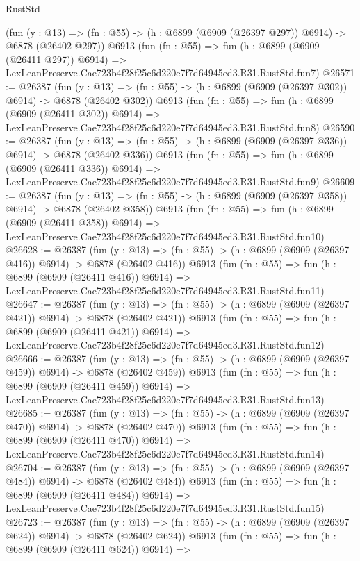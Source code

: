 \begin{lexlean}{RustStd}
\begin{coremodule}
    (fun (y : @13) => (fn : @55) -> (h : @6899 (@6909 (@26397 @297)) @6914) -> @6878 (@26402 @297))
    @6913
    (fun (fn : @55) =>
    fun (h : @6899 (@6909 (@26411 @297)) @6914) =>
    LexLeanPreserve.Cae723b4f28f25c6d220e7f7d64945ed3.R31.RustStd.fun7)
@26571 := @26387
    (fun (y : @13) => (fn : @55) -> (h : @6899 (@6909 (@26397 @302)) @6914) -> @6878 (@26402 @302))
    @6913
    (fun (fn : @55) =>
    fun (h : @6899 (@6909 (@26411 @302)) @6914) =>
    LexLeanPreserve.Cae723b4f28f25c6d220e7f7d64945ed3.R31.RustStd.fun8)
@26590 := @26387
    (fun (y : @13) => (fn : @55) -> (h : @6899 (@6909 (@26397 @336)) @6914) -> @6878 (@26402 @336))
    @6913
    (fun (fn : @55) =>
    fun (h : @6899 (@6909 (@26411 @336)) @6914) =>
    LexLeanPreserve.Cae723b4f28f25c6d220e7f7d64945ed3.R31.RustStd.fun9)
@26609 := @26387
    (fun (y : @13) => (fn : @55) -> (h : @6899 (@6909 (@26397 @358)) @6914) -> @6878 (@26402 @358))
    @6913
    (fun (fn : @55) =>
    fun (h : @6899 (@6909 (@26411 @358)) @6914) =>
    LexLeanPreserve.Cae723b4f28f25c6d220e7f7d64945ed3.R31.RustStd.fun10)
@26628 := @26387
    (fun (y : @13) => (fn : @55) -> (h : @6899 (@6909 (@26397 @416)) @6914) -> @6878 (@26402 @416))
    @6913
    (fun (fn : @55) =>
    fun (h : @6899 (@6909 (@26411 @416)) @6914) =>
    LexLeanPreserve.Cae723b4f28f25c6d220e7f7d64945ed3.R31.RustStd.fun11)
@26647 := @26387
    (fun (y : @13) => (fn : @55) -> (h : @6899 (@6909 (@26397 @421)) @6914) -> @6878 (@26402 @421))
    @6913
    (fun (fn : @55) =>
    fun (h : @6899 (@6909 (@26411 @421)) @6914) =>
    LexLeanPreserve.Cae723b4f28f25c6d220e7f7d64945ed3.R31.RustStd.fun12)
@26666 := @26387
    (fun (y : @13) => (fn : @55) -> (h : @6899 (@6909 (@26397 @459)) @6914) -> @6878 (@26402 @459))
    @6913
    (fun (fn : @55) =>
    fun (h : @6899 (@6909 (@26411 @459)) @6914) =>
    LexLeanPreserve.Cae723b4f28f25c6d220e7f7d64945ed3.R31.RustStd.fun13)
@26685 := @26387
    (fun (y : @13) => (fn : @55) -> (h : @6899 (@6909 (@26397 @470)) @6914) -> @6878 (@26402 @470))
    @6913
    (fun (fn : @55) =>
    fun (h : @6899 (@6909 (@26411 @470)) @6914) =>
    LexLeanPreserve.Cae723b4f28f25c6d220e7f7d64945ed3.R31.RustStd.fun14)
@26704 := @26387
    (fun (y : @13) => (fn : @55) -> (h : @6899 (@6909 (@26397 @484)) @6914) -> @6878 (@26402 @484))
    @6913
    (fun (fn : @55) =>
    fun (h : @6899 (@6909 (@26411 @484)) @6914) =>
    LexLeanPreserve.Cae723b4f28f25c6d220e7f7d64945ed3.R31.RustStd.fun15)
@26723 := @26387
    (fun (y : @13) => (fn : @55) -> (h : @6899 (@6909 (@26397 @624)) @6914) -> @6878 (@26402 @624))
    @6913
    (fun (fn : @55) =>
    fun (h : @6899 (@6909 (@26411 @624)) @6914) =>

\end{coremodule}
\end{lexlean}
